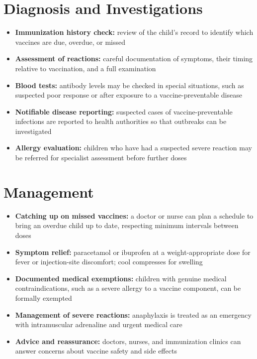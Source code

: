 \section*{Diagnosis and Investigations}
\begin{itemize}
    \item \textbf{Immunization history check:} review of the child's record to identify which vaccines are due, overdue, or missed
    \item \textbf{Assessment of reactions:} careful documentation of symptoms, their timing relative to vaccination, and a full examination
    \item \textbf{Blood tests:} antibody levels may be checked in special situations, such as suspected poor response or after exposure to a vaccine-preventable disease
    \item \textbf{Notifiable disease reporting:} suspected cases of vaccine-preventable infections are reported to health authorities so that outbreaks can be investigated
    \item \textbf{Allergy evaluation:} children who have had a suspected severe reaction may be referred for specialist assessment before further doses
\end{itemize}

\section*{Management}
\begin{itemize}
    \item \textbf{Catching up on missed vaccines:} a doctor or nurse can plan a schedule to bring an overdue child up to date, respecting minimum intervals between doses
    \item \textbf{Symptom relief:} paracetamol or ibuprofen at a weight-appropriate dose for fever or injection-site discomfort; cool compresses for swelling
    \item \textbf{Documented medical exemptions:} children with genuine medical contraindications, such as a severe allergy to a vaccine component, can be formally exempted
    \item \textbf{Management of severe reactions:} anaphylaxis is treated as an emergency with intramuscular adrenaline and urgent medical care
    \item \textbf{Advice and reassurance:} doctors, nurses, and immunization clinics can answer concerns about vaccine safety and side effects
\end{itemize}

